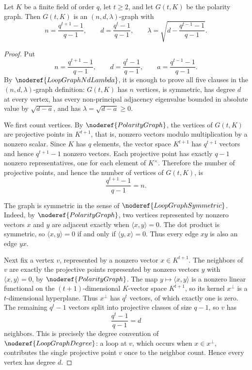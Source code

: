 \begin{lemma}
Let \(K\) be a finite field of order \(q\), let \(t\ge 2\), and let \(G(t,K)\) be the polarity graph. Then \(G(t,K)\) is an \((n,d,\lambda)\)-graph with
\[
  n=\frac{q^{t+1}-1}{q-1},\qquad
  d=\frac{q^t-1}{q-1},\qquad
  \lambda=\sqrt{d-\frac{q^{t-1}-1}{q-1}}.
\]
\end{lemma}
\begin{proof}
Put
\[
  n=\frac{q^{t+1}-1}{q-1},\qquad
  d=\frac{q^t-1}{q-1},\qquad
  a=\frac{q^{t-1}-1}{q-1}.
\]
By \(\noderef{LoopGraphNdLambda}\), it is enough to prove all five clauses in the \((n,d,\lambda)\)-graph definition: \(G(t,K)\) has \(n\) vertices, is symmetric, has degree \(d\) at every vertex, has every non-principal adjacency eigenvalue bounded in absolute value by \(\sqrt{d-a}\), and has \(\lambda=\sqrt{d-a}\ge 0\).

We first count vertices. By \(\noderef{PolarityGraph}\), the vertices of \(G(t,K)\) are projective points in \(K^{t+1}\), that is, nonzero vectors modulo multiplication by a nonzero scalar. Since \(K\) has \(q\) elements, the vector space \(K^{t+1}\) has \(q^{t+1}\) vectors and hence \(q^{t+1}-1\) nonzero vectors. Each projective point has exactly \(q-1\) nonzero representatives, one for each element of \(K^\times\). Therefore the number of projective points, and hence the number of vertices of \(G(t,K)\), is
\[
  \frac{q^{t+1}-1}{q-1}=n.
\]

The graph is symmetric in the sense of \(\noderef{LoopGraphSymmetric}\). Indeed, by \(\noderef{PolarityGraph}\), two vertices represented by nonzero vectors \(x\) and \(y\) are adjacent exactly when \(\langle x,y\rangle=0\). The dot product is symmetric, so \(\langle x,y\rangle=0\) if and only if \(\langle y,x\rangle=0\). Thus every edge \(xy\) is also an edge \(yx\).

Next fix a vertex \(v\), represented by a nonzero vector \(x\in K^{t+1}\). The neighbors of \(v\) are exactly the projective points represented by nonzero vectors \(y\) with \(\langle x,y\rangle=0\), by \(\noderef{PolarityGraph}\). The map \(y\mapsto \langle x,y\rangle\) is a nonzero linear functional on the \((t+1)\)-dimensional \(K\)-vector space \(K^{t+1}\), so its kernel \(x^\perp\) is a \(t\)-dimensional hyperplane. Thus \(x^\perp\) has \(q^t\) vectors, of which exactly one is zero. The remaining \(q^t-1\) vectors split into projective classes of size \(q-1\), so \(v\) has
\[
  \frac{q^t-1}{q-1}=d
\]
neighbors. This is precisely the degree convention of \(\noderef{LoopGraphDegree}\): a loop at \(v\), which occurs when \(x\in x^\perp\), contributes the single projective point \(v\) once to the neighbor count. Hence every vertex has degree \(d\).


\end{proof}
